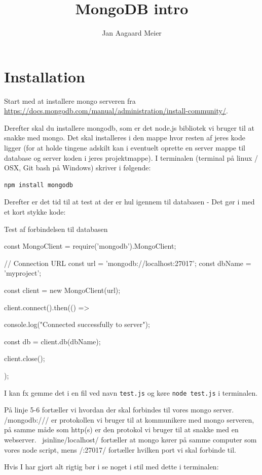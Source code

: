 \documentclass[english,course]{lecture}
\title{MongoDB intro}
\author{Jan Aagaard Meier}
\begin{document}
\section{Installation}
Start med at installere mongo serveren fra \url{https://docs.mongodb.com/manual/administration/install-community/}. 

Derefter skal du installere mongodb, som er det node.js bibliotek vi bruger til at snakke med mongo. Det skal installeres i den mappe hvor resten af jeres kode ligger (for at holde tingene adskilt kan i eventuelt oprette en server mappe til database og server koden i jeres projektmappe). I terminalen (terminal på linux / OSX, Git bash på Windows) skriver i følgende:

\begin{verbatim}
npm install mongodb
\end{verbatim}

Derefter er det tid til at test at der er hul igennem til databasen - Det gør i med et kort stykke kode: 

\begin{listing}[H]
\caption{Test af forbindelsen til databasen}
\label{lst:testconnection}
\begin{jscode}
const MongoClient = require('mongodb').MongoClient;

// Connection URL
const url = 'mongodb://localhost:27017';
const dbName = 'myproject';

const client = new MongoClient(url);

client.connect().then(() => {
  console.log("Connected successfully to server");

  const db = client.db(dbName);

  client.close();
});
\end{jscode}
\end{listing}

I kan fx gemme det i en fil ved navn \texttt{test.js} og køre \texttt{node test.js} i terminalen.

På linje 5-6 fortæller vi hvordan der skal forbindes til vores mongo server. \jsinline/mongodb:/// er protokollen vi bruger til at kommunikere med mongo serveren, på samme måde som http(s) er den protokol vi bruger til at snakke med en webserver.
 \ jsinline/localhost/ fortæller at mongo kører på samme computer som vores node script, mens \jsinline/:27017/ fortæller hvilken port vi skal forbinde til.

Hvis I har gjort alt rigtig bør i se noget i stil med dette i terminalen:
\end{document}
